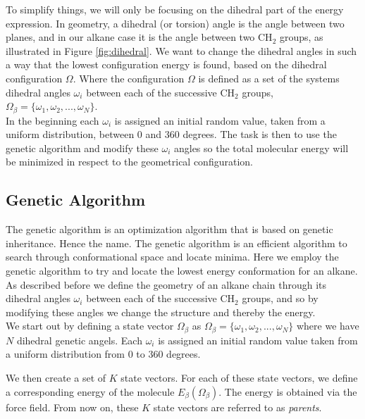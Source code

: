 \documentclass{article}
\begin{document}
To simplify things, we will only be focusing on the dihedral part of the energy expression.
%
In geometry, a dihedral (or torsion) angle is the angle between two planes, and in our alkane case it is the angle between two CH$_2$ groups, as illustrated in Figure \ref{fig:dihedral}.
%
We want to change the dihedral angles in such a way that the lowest configuration energy is found, based on the dihedral configuration $\Omega$.
%
Where the configuration $\Omega$ is defined as a set of the systems dihedral angles $\omega_i$ between each of the successive CH$_2$ groups, $\Omega_\beta = \{ \omega_1, \omega_2, ... , \omega_N \}$.\\

In the beginning each $\omega_i$ is assigned an initial random value, taken from a uniform distribution, between 0 and 360 degrees.
%
The task is then to use the genetic algorithm and modify these $\omega_i$ angles so the total molecular energy will be minimized in respect to the geometrical configuration.

\subsection{Genetic Algorithm}

The genetic algorithm is an optimization algorithm that is based on genetic inheritance.
Hence the name. 
The genetic algorithm is an efficient algorithm to search through conformational space and locate minima. 
Here we employ the genetic algorithm to try and locate the lowest energy conformation for an alkane.\\

As described before we define the geometry of an alkane chain through its dihedral angles $\omega_i$ between each of the successive CH$_2$ groups, and so by modifying these angles we change the structure and thereby the energy.\\

We start out by defining a state vector $\Omega_\beta$ as $\Omega_\beta = \{ \omega_1, \omega_2, ... , \omega_N \}$ where we have $N$ dihedral genetic angels.
Each $\omega_i$ is assigned an initial random value taken from a uniform distribution from 0 to 360 degrees.

% 

We then create a set of $K$ state vectors.
For each of these state vectors, we define a corresponding energy of the molecule $E_\beta(\Omega_\beta)$.
The energy is obtained via the force field.
From now on, these $K$ state vectors are referred to as \emph{parents}.\\
\end{document}
